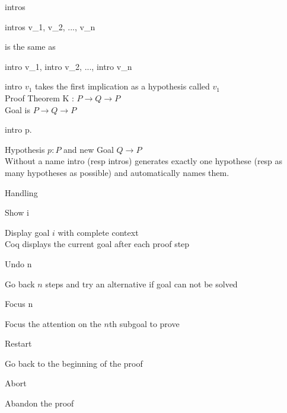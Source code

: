 \begin{frame}[fragile]{intros}
	\begin{user}
		intros v_1, v_2, ..., v_n
	\end{user}
	is the same as
	\begin{user}
		intro v_1, intro v_2, ..., intro v_n
	\end{user}
	\pause
	intro $v_1$ takes the first implication as a hypothesis called $v_1$\\
	\medskip
	\pause
	Proof Theorem K : $P \rightarrow Q \rightarrow P$\\
	\pause
	Goal is  $P \rightarrow Q \rightarrow P$\\
	\pause
	\begin{user}
		intro p.
	\end{user}
	Hypothesis $p:P$ and new Goal $Q \rightarrow P$\\
	\pause
	\bigskip
	Without a name intro (resp intros) generates exactly one hypothese (resp as many hypotheses as possible) and automatically names them.
\end{frame}
\begin{frame}[fragile]{Handling}
	\begin{user}
		Show i
	\end{user}
	Display goal $i$ with complete context\\
	Coq displays the current goal after each proof step
	\pause
	\medskip
	\begin{user}
		Undo n
	\end{user}
	Go back $n$ steps and try an alternative if goal can not be solved
	\pause
	\medskip
	\begin{user}
		Focus n
	\end{user}
	Focus the attention on the $n$th subgoal to prove
	\pause
	\medskip
	\begin{user}
		Restart
	\end{user}
	Go back to the beginning of the proof
	\pause
	\medskip
	\begin{user}
		Abort
	\end{user}
	Abandon the proof
\end{frame}

